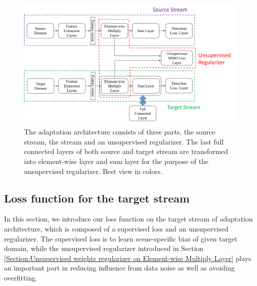 \documentclass[runningheads]{llncs}
\begin{document}
\begin{figure}
\centering
\includegraphics[height=6.5cm]{images/streams.png}
\caption{The adaptation architecture consists of three parts, the source stream, the stream and an unsupervised regularizer. The last full connected layers of both source and target stream are transformed into element-wise layer and sum layer for the purpose of the unsupervised regularizer. Best view in colors.}
\label{fig:streams}
\end{figure}

\subsection{Loss function for the target stream}
\label{Section:Loss function for the target stream}

In this section, we introduce our loss function on the target stream of adaptation architecture, which is composed of a supervised loss and an unsupervised regularizer. The supervised loss is to learn scene-specific bias of given target domain, while the unsupervised regularizer introduced in Section \ref{Section:Unsupervised weights regularizer on Element-wise Multiply Layer} plays an important part in reducing influence from data noise as well as avoiding overfitting.
\end{document}
